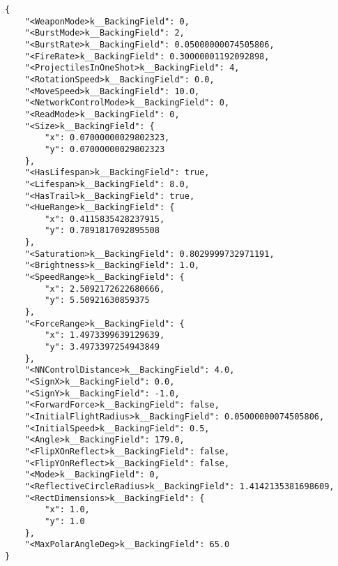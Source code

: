 \begin{lstlisting}[caption={Пример json файла с параметрами некоторого оружия},label={lst:json}]
{
    "<WeaponMode>k__BackingField": 0,
    "<BurstMode>k__BackingField": 2,
    "<BurstRate>k__BackingField": 0.05000000074505806,
    "<FireRate>k__BackingField": 0.30000001192092898,
    "<ProjectilesInOneShot>k__BackingField": 4,
    "<RotationSpeed>k__BackingField": 0.0,
    "<MoveSpeed>k__BackingField": 10.0,
    "<NetworkControlMode>k__BackingField": 0,
    "<ReadMode>k__BackingField": 0,
    "<Size>k__BackingField": {
        "x": 0.07000000029802323,
        "y": 0.07000000029802323
    },
    "<HasLifespan>k__BackingField": true,
    "<Lifespan>k__BackingField": 8.0,
    "<HasTrail>k__BackingField": true,
    "<HueRange>k__BackingField": {
        "x": 0.4115835428237915,
        "y": 0.7891817092895508
    },
    "<Saturation>k__BackingField": 0.8029999732971191,
    "<Brightness>k__BackingField": 1.0,
    "<SpeedRange>k__BackingField": {
        "x": 2.5092172622680666,
        "y": 5.50921630859375
    },
    "<ForceRange>k__BackingField": {
        "x": 1.4973399639129639,
        "y": 3.4973397254943849
    },
    "<NNControlDistance>k__BackingField": 4.0,
    "<SignX>k__BackingField": 0.0,
    "<SignY>k__BackingField": -1.0,
    "<ForwardForce>k__BackingField": false,
    "<InitialFlightRadius>k__BackingField": 0.05000000074505806,
    "<InitialSpeed>k__BackingField": 0.5,
    "<Angle>k__BackingField": 179.0,
    "<FlipXOnReflect>k__BackingField": false,
    "<FlipYOnReflect>k__BackingField": false,
    "<Mode>k__BackingField": 0,
    "<ReflectiveCircleRadius>k__BackingField": 1.4142135381698609,
    "<RectDimensions>k__BackingField": {
        "x": 1.0,
        "y": 1.0
    },
    "<MaxPolarAngleDeg>k__BackingField": 65.0
}
\end{lstlisting}



